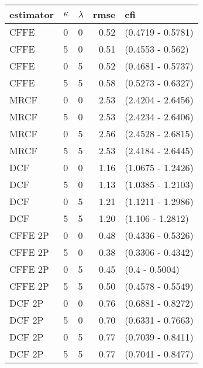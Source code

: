 \begin{tabular}{lllrl}
  \hline
estimator & $\kappa$ & $\lambda$ & rmse & cfi \\ 
  \hline
CFFE  & 0 & 0 & 0.52 & (0.4719 - 0.5781) \\ 
  CFFE  & 5 & 0 & 0.51 & (0.4553 - 0.562) \\ 
  CFFE  & 0 & 5 & 0.52 & (0.4681 - 0.5737) \\ 
  CFFE  & 5 & 5 & 0.58 & (0.5273 - 0.6327) \\ 
  MRCF  & 0 & 0 & 2.53 & (2.4204 - 2.6456) \\ 
  MRCF  & 5 & 0 & 2.53 & (2.4234 - 2.6406) \\ 
  MRCF  & 0 & 5 & 2.56 & (2.4528 - 2.6815) \\ 
  MRCF  & 5 & 5 & 2.53 & (2.4184 - 2.6445) \\ 
  DCF  & 0 & 0 & 1.16 & (1.0675 - 1.2426) \\ 
  DCF  & 5 & 0 & 1.13 & (1.0385 - 1.2103) \\ 
  DCF  & 0 & 5 & 1.21 & (1.1211 - 1.2986) \\ 
  DCF  & 5 & 5 & 1.20 & (1.106 - 1.2812) \\ 
  CFFE 2P  & 0 & 0 & 0.48 & (0.4336 - 0.5326) \\ 
  CFFE 2P  & 5 & 0 & 0.38 & (0.3306 - 0.4342) \\ 
  CFFE 2P  & 0 & 5 & 0.45 & (0.4 - 0.5004) \\ 
  CFFE 2P  & 5 & 5 & 0.50 & (0.4578 - 0.5549) \\ 
  DCF 2P  & 0 & 0 & 0.76 & (0.6881 - 0.8272) \\ 
  DCF 2P  & 5 & 0 & 0.70 & (0.6331 - 0.7663) \\ 
  DCF 2P  & 0 & 5 & 0.77 & (0.7039 - 0.8411) \\ 
  DCF 2P  & 5 & 5 & 0.77 & (0.7041 - 0.8477) \\ 
   \hline
\end{tabular}
